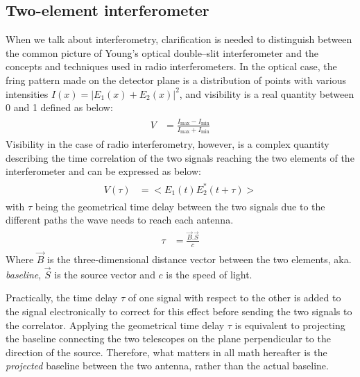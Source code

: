 \documentclass[paper=a4, fontsize=11pt]{scrartcl} %
\numberwithin{equation}{section} %
\numberwithin{figure}{section} %
\numberwithin{table}{section} %
\begin{document}
\subsection{Two-element interferometer}
When we talk about interferometry, clarification is needed to distinguish between the common picture of Young's optical double--slit interferometer and the concepts and techniques used in radio interferometers. In the optical case, the fring pattern made on the detector plane is a distribution of points with various intensities $I(x) = |E_1(x) + E_2(x)|^2$, and visibility is a real quantity between 0 and 1 defined as below:
\begin{align} 
\begin{split}
V &= \frac{I_\mathrm{max} - I_\mathrm{min}}{I_\mathrm{max} + I_\mathrm{min}}
\end{split}                    
\end{align}
Visibility in the case of radio interferometry, however, is a complex quantity describing the time correlation of the two signals reaching the two elements of the interferometer and can be expressed as below:
\begin{align} 
\begin{split}
\label{eq:vis_def}
V(\tau) &= <E_1(t)E_2^*(t+\tau)>
\end{split}                    
\end{align}
with $\tau$ being the geometrical time delay between the two signals due to the different paths the wave needs to reach each antenna.
\begin{align} 
\begin{split}
\tau &= \frac{\vec{B}.\vec{S}}{c}
\end{split}                    
\end{align}
Where $\vec{B}$ is the three-dimensional distance vector between the two elements, aka. \emph{baseline}, $\vec{S}$ is the source vector and $c$ is the speed of light.



Practically, the time delay $\tau$ of one signal with respect to the other is added to the signal electronically to correct for this effect before sending the two signals to the correlator. Applying the geometrical time delay $\tau$ is equivalent to projecting the baseline connecting the two telescopes on the plane perpendicular to the direction of the source. Therefore, what matters in all math hereafter is the \emph{projected} baseline between the two antenna, rather than the actual baseline. 
\end{document}
